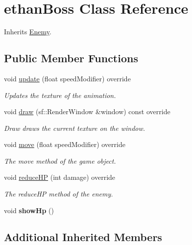 \hypertarget{classethan_boss}{\section{ethan\+Boss Class Reference}
\label{classethan_boss}
}


Inherits \hyperlink{class_enemy}{Enemy}.

\subsection*{Public Member Functions}
\begin{DoxyCompactItemize}
\item 
void \hyperlink{classethan_boss_a6e47b12c5e718ecee5d888bcde580c1a}{update} (float speed\+Modifier) override
\begin{DoxyCompactList}\small\item\em Updates the texture of the animation. \end{DoxyCompactList}\item 
void \hyperlink{classethan_boss_af42458496295b946615a8d53277925f5}{draw} (sf\+::\+Render\+Window \&window) const override
\begin{DoxyCompactList}\small\item\em Draw draws the current texture on the window. \end{DoxyCompactList}\item 
void \hyperlink{classethan_boss_a2797ae895a6a8954b071a181a9b425a9}{move} (float speed\+Modifier) override
\begin{DoxyCompactList}\small\item\em The move method of the game object. \end{DoxyCompactList}\item 
void \hyperlink{classethan_boss_aba2f8a6fc46aae30ab5b59b4cc714d09}{reduce\+H\+P} (int damage) override
\begin{DoxyCompactList}\small\item\em The reduce\+H\+P method of the enemy. \end{DoxyCompactList}\item 
\hypertarget{classethan_boss_ab8d1fc5061627ce993a18af115d78b2b}{void {\bfseries show\+Hp} ()}\label{classethan_boss_ab8d1fc5061627ce993a18af115d78b2b}

\end{DoxyCompactItemize}
\subsection*{Additional Inherited Members}


